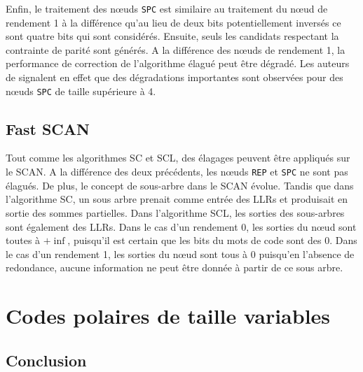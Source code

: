 Enfin, le traitement des nœuds \texttt{SPC} est similaire au traitement du nœud de rendement 1 à la différence qu'au lieu de deux bits potentiellement inversés ce sont quatre bits qui sont considérés. Ensuite, seuls les candidats respectant la contrainte de parité sont générés. A la différence des nœuds de rendement 1, la performance de correction de l'algorithme élagué peut être dégradé. Les auteurs de \cite{sarkis_fast_2016} signalent en effet que des dégradations importantes sont observées pour des nœuds \texttt{SPC} de taille supérieure à 4. 


\subsection{Fast SCAN}
Tout comme les algorithmes SC et SCL, des élagages peuvent être appliqués sur le SCAN. A la différence des deux précédents, les nœuds \texttt{REP} et \texttt{SPC} ne sont pas élagués. De plus, le concept de sous-arbre dans le SCAN évolue. Tandis que dans l'algorithme SC, un sous arbre prenait comme entrée des LLRs et produisait en sortie des sommes partielles. Dans l'algorithme SCL, les sorties des sous-arbres sont également des LLRs. Dans le cas d'un rendement 0, les sorties du nœud sont toutes à $+\inf$, puisqu'il est certain que les bits du mots de code sont des $0$. Dans le cas d'un rendement 1, les sorties du nœud sont tous à $0$ puisqu'en l'absence de redondance, aucune information ne peut être donnée à partir de ce sous arbre.

\section{Codes polaires de taille variables}


\subsection*{Conclusion}
{}